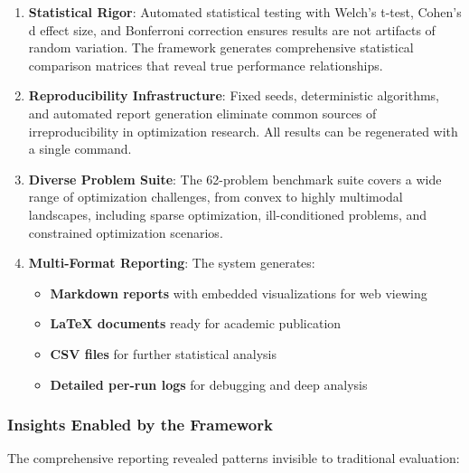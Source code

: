 \begin{enumerate}
\def\labelenumi{\arabic{enumi}.}
\item
  \textbf{Statistical Rigor}: Automated statistical testing with Welch's t-test, Cohen's d effect size, and Bonferroni correction ensures results are not artifacts of random variation. The framework generates comprehensive statistical comparison matrices that reveal true performance relationships.
\item
  \textbf{Reproducibility Infrastructure}: Fixed seeds, deterministic algorithms, and automated report generation eliminate common sources of irreproducibility in optimization research. All results can be regenerated with a single command.
\item
  \textbf{Diverse Problem Suite}: The 62-problem benchmark suite covers a wide range of optimization challenges, from convex to highly multimodal landscapes, including sparse optimization, ill-conditioned problems, and constrained optimization scenarios.
\item
  \textbf{Multi-Format Reporting}: The system generates:

  \begin{itemize}
  \tightlist
  \item
    \textbf{Markdown reports} with embedded visualizations for web viewing
  \item
    \textbf{LaTeX documents} ready for academic publication
  \item
    \textbf{CSV files} for further statistical analysis
  \item
    \textbf{Detailed per-run logs} for debugging and deep analysis
  \end{itemize}
\end{enumerate}

\hypertarget{insights-enabled-by-the-framework}{%
\subsubsection{Insights Enabled by the Framework}\label{insights-enabled-by-the-framework}}

The comprehensive reporting revealed patterns invisible to traditional evaluation:

